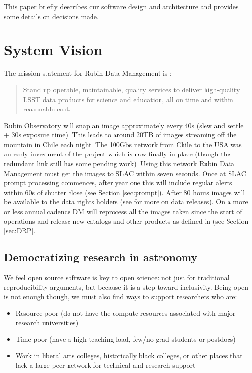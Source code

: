 \documentclass[11pt,twoside]{article}
\begin{document}
This paper briefly describes our software design and architecture and provides some details on decisions made.

\section{System Vision}
The mission statement for Rubin Data Management is :
\begin{quote}
Stand up operable, maintainable, quality services to deliver high-quality LSST data products for science and education, all on time and within reasonable cost.

\end{quote}

Rubin Observatory will snap an image approximately every 40s (slew and settle + 30s exposure time).
This leads to around 20TB of images streaming off the mountain in Chile each night.
The 100Gbs network from Chile to the USA was an early investment of the project which is now finally in place (though the redundant link still has some pending work).
Using this network Rubin Data Management must get the images to SLAC within seven seconds.
Once at SLAC prompt processing commences, after year one this will include regular alerts within 60s of shutter close (see Section \ref{sec:prompt}).
After 80 hours images will be available to the data rights holders (see \citep{RDO-011} for more on data releases).
On a more or less annual cadence DM will reprocess all the images taken since the start of operations and release new catalogs and other products as defined in \citet{LSE-163} (see Section \ref{sec:DRP}.


\subsection{Democratizing research in astronomy}

We feel open source software is key to open science: not just for traditional reproducibility arguments, but because it is a step toward inclusivity.
Being open is not enough though, we must also find ways to support researchers who are:

\begin{itemize}
\item Resource-poor (do not have the compute resources associated with major research universities)
\item Time-poor (have a high teaching load, few/no grad students or postdocs)
\item Work in liberal arts colleges, historically black colleges, or other places that lack a large peer network for technical and research support

\end{itemize}
\end{document}
